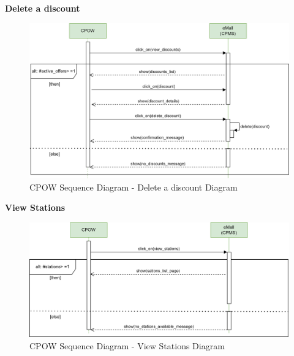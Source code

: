 \documentclass[table, 12pt]{article} %
\begin{document}
\begin{itemize}
            \textbf{Delete a discount}
            \begin{center}
                \begin{figure}[H]
                    \includegraphics[scale=0.55, center]{assets/sequenceDiagrams/Delete Discount.png}
                    \caption{CPOW Sequence Diagram - Delete a discount Diagram}
                    \label{fig: Delete a discount}
                \end{figure}
            \end{center}

            \textbf{View Stations}
            \begin{center}
                \begin{figure}[H]
                    \includegraphics[scale=0.55, center]{assets/sequenceDiagrams/View Stations.png}
                    \caption{CPOW Sequence Diagram - View Stations Diagram}
                    \label{fig: View Stations}
                \end{figure}
            \end{center}


\end{itemize}
\end{document}
